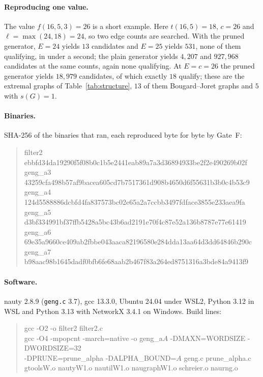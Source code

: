 \documentclass[11pt]{article}
\theoremstyle{definition}
\theoremstyle{remark}
\begin{document}
\paragraph{Reproducing one value.} The value $f(16,5,3)=26$ is a short example. Here $t(16,5)=18$, $c=26$ and
$\ell=\max(24,18)=24$, so two edge counts are searched. With the pruned generator, $E=24$ yields $13$ candidates and
$E=25$ yields $531$, none of them qualifying, in under a second; the plain generator yields $4{,}207$ and $927{,}968$
candidates at the same counts, again none qualifying. At $E=c=26$ the pruned generator yields $18{,}979$ candidates,
of which exactly $18$ qualify; these are the extremal graphs of Table~\ref{tab:structure}, $13$ of them Bougard--Joret
graphs and $5$ with $s(G)=1$.

\paragraph{Binaries.} SHA-256 of the binaries that ran, each reproduced byte for byte by Gate~F:
\begin{quote}\footnotesize\ttfamily
filter2 ebbfd34da19290f5f08b0c1b5e2441eab89a7a3d36894933be2f2e490269b02f\\
geng\_a3 43259cfa498b57af9bacea605cd7b7517361d908b4650d6f55631b3b0c4b53c9\\
geng\_a4 124d5588886dcbfd4fa837573bc02e65a2a7ccbb3497fdface3855e233aea9fa\\
geng\_a5 d3bf334991bf37ffb5428a5bc43b6ad2191e70f4c87e52a136b8787e77e61419\\
geng\_a6 69e35a9660ce409ab2fbbe043aaca82196580e284dda13aa64d3dd64846b290c\\
geng\_a7 b98aac98b1645dadf0bfb6fe68aab2b467f83a264ed8751316a3bde84a9413f9
\end{quote}

\paragraph{Software.} nauty 2.8.9 (\texttt{geng.c} 3.7), gcc 13.3.0, Ubuntu 24.04 under WSL2, Python 3.12 in
WSL and Python 3.13 with NetworkX 3.4.1 on Windows. Build lines:
\begin{quote}\small\ttfamily
gcc -O2 -o filter2 filter2.c\\
gcc -O4 -mpopcnt -march=native -o geng\_a$A$ -DMAXN=WORDSIZE -DWORDSIZE=32\\
\quad -DPRUNE=prune\_alpha -DALPHA\_BOUND=$A$ geng.c prune\_alpha.c\\
\quad gtoolsW.o nautyW1.o nautilW1.o naugraphW1.o schreier.o naurng.o
\end{quote}
\end{document}
